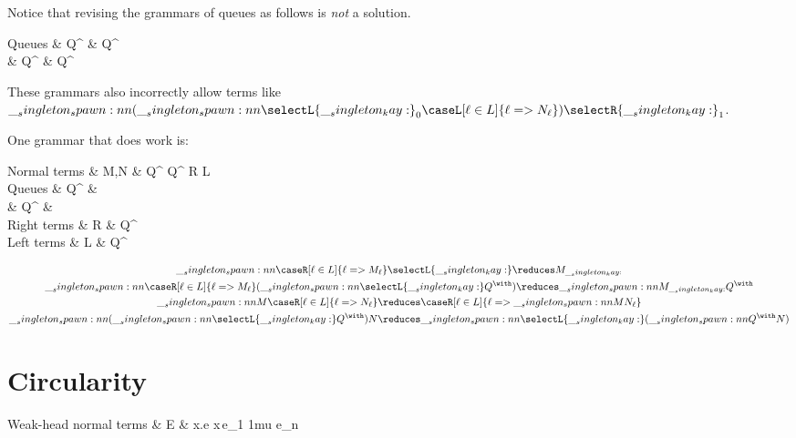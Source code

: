 Notice that revising the grammars of queues as follows is \emph{not} a solution.
\begin{syntax*}
  Q{ueues} & Q^{\plus} &
    \selectR{\kay} \mid {} \mid Q^{\with} \mid {}
  \\
  & Q^{\with} &
    \selectL{\kay} \mid {} \mid Q^{\plus} \mid {}
\end{syntax*}
These grammars also incorrectly allow terms like $\spawn{(\spawn{\selectL{\kay}_0}{\caseL[\ell \in L]{\ell => N_{\ell}}})}{\selectR{\kay}_1}$.

One grammar that does work is:
\begin{syntax*}
  Normal terms & M,N &
    \fwd \mid Q^{\plus} \mid Q^{\with} \mid R \mid L
  \\
  Q{ueues} & Q^{\plus} &
    \selectR{\kay} \mid {}
  \\
  & Q^{\with} &
    \selectL{\kay} \mid {}
  \\
  Right terms & R &
     \mid Q^{\with} \mid {}
  \\
  Left terms & L &
     \mid Q^{\plus} \mid {}
\end{syntax*}


\begin{gather*}
  \spawn{\caseR[\ell \in L]{\ell => M_{\ell}}}
        {\selectL{\kay}}
    \reduces
    M_{\kay}
  \\
  \spawn{\caseR[\ell \in L]{\ell => M_{\ell}}}
        {(\spawn{\selectL{\kay}}{Q^{\with}})}
    \reduces
    \spawn{M_{\kay}}{Q^{\with}}
  \\
  \spawn{M}
        {\caseR[\ell \in L]{\ell => N_{\ell}}}
    \reduces
    \caseR[\ell \in L]{\ell => \spawn{M}{N_{\ell}}}
  \\
  \spawn{(\spawn{\selectL{\kay}}{Q^{\with}})}
        {N}
    \reduces
    \spawn{\selectL{\kay}}{(\spawn{Q^{\with}}{N})}
\end{gather*}


\section{Circularity}

\begin{syntax*}
  Weak-head normal terms & E &
    \lambda x.e \mid x\,e_1 \dotsm\mkern1mu e_n
\end{syntax*}


